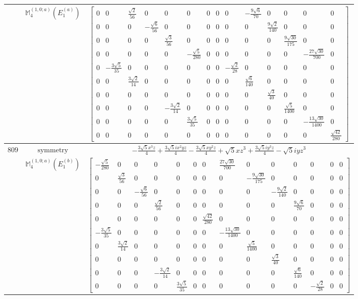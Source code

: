 \documentclass[fleqn,8pt,landscape]{jsarticle}
\begin{document}
\begin{longtable}{ccc}
$  $ & $ \mathbb{M}_{4}^{(1,0;a)}(E_{1}^{(a)}) $ & $ \begin{bmatrix} 0 & 0 & \frac{\sqrt{2}}{56} & 0 & 0 & 0 & 0 & 0 & 0 & - \frac{9 \sqrt{6}}{70} & 0 & 0 & 0 & 0 \\ 0 & 0 & 0 & - \frac{\sqrt{6}}{56} & 0 & 0 & 0 & 0 & 0 & 0 & \frac{9 \sqrt{2}}{140} & 0 & 0 & 0 \\ 0 & 0 & 0 & 0 & \frac{\sqrt{3}}{56} & 0 & 0 & 0 & 0 & 0 & 0 & \frac{9 \sqrt{30}}{175} & 0 & 0 \\ 0 & 0 & 0 & 0 & 0 & - \frac{\sqrt{5}}{280} & 0 & 0 & 0 & 0 & 0 & 0 & - \frac{27 \sqrt{30}}{700} & 0 \\ 0 & - \frac{3 \sqrt{5}}{35} & 0 & 0 & 0 & 0 & 0 & 0 & - \frac{\sqrt{2}}{28} & 0 & 0 & 0 & 0 & 0 \\ 0 & 0 & \frac{3 \sqrt{2}}{14} & 0 & 0 & 0 & 0 & 0 & 0 & \frac{\sqrt{6}}{140} & 0 & 0 & 0 & 0 \\ 0 & 0 & 0 & 0 & 0 & 0 & 0 & 0 & 0 & 0 & \frac{\sqrt{3}}{40} & 0 & 0 & 0 \\ 0 & 0 & 0 & 0 & - \frac{3 \sqrt{2}}{14} & 0 & 0 & 0 & 0 & 0 & 0 & \frac{\sqrt{5}}{1400} & 0 & 0 \\ 0 & 0 & 0 & 0 & 0 & \frac{3 \sqrt{5}}{35} & 0 & 0 & 0 & 0 & 0 & 0 & - \frac{13 \sqrt{30}}{1400} & 0 \\ 0 & 0 & 0 & 0 & 0 & 0 & 0 & 0 & 0 & 0 & 0 & 0 & 0 & \frac{\sqrt{42}}{280} \end{bmatrix} $ \\ \hline
$ 809 $ & $ \text{symmetry} $ & $ - \frac{3 \sqrt{5} x^{3} z}{4} + \frac{3 \sqrt{5} i x^{2} y z}{4} - \frac{3 \sqrt{5} x y^{2} z}{4} + \sqrt{5} x z^{3} + \frac{3 \sqrt{5} i y^{3} z}{4} - \sqrt{5} i y z^{3} $ \\
$  $ & $ \mathbb{M}_{4}^{(1,0;a)}(E_{1}^{(b)}) $ & $ \begin{bmatrix} - \frac{\sqrt{5}}{280} & 0 & 0 & 0 & 0 & 0 & 0 & \frac{27 \sqrt{30}}{700} & 0 & 0 & 0 & 0 & 0 & 0 \\ 0 & \frac{\sqrt{3}}{56} & 0 & 0 & 0 & 0 & 0 & 0 & - \frac{9 \sqrt{30}}{175} & 0 & 0 & 0 & 0 & 0 \\ 0 & 0 & - \frac{\sqrt{6}}{56} & 0 & 0 & 0 & 0 & 0 & 0 & - \frac{9 \sqrt{2}}{140} & 0 & 0 & 0 & 0 \\ 0 & 0 & 0 & \frac{\sqrt{2}}{56} & 0 & 0 & 0 & 0 & 0 & 0 & \frac{9 \sqrt{6}}{70} & 0 & 0 & 0 \\ 0 & 0 & 0 & 0 & 0 & 0 & \frac{\sqrt{42}}{280} & 0 & 0 & 0 & 0 & 0 & 0 & 0 \\ - \frac{3 \sqrt{5}}{35} & 0 & 0 & 0 & 0 & 0 & 0 & - \frac{13 \sqrt{30}}{1400} & 0 & 0 & 0 & 0 & 0 & 0 \\ 0 & \frac{3 \sqrt{2}}{14} & 0 & 0 & 0 & 0 & 0 & 0 & \frac{\sqrt{5}}{1400} & 0 & 0 & 0 & 0 & 0 \\ 0 & 0 & 0 & 0 & 0 & 0 & 0 & 0 & 0 & \frac{\sqrt{3}}{40} & 0 & 0 & 0 & 0 \\ 0 & 0 & 0 & - \frac{3 \sqrt{2}}{14} & 0 & 0 & 0 & 0 & 0 & 0 & \frac{\sqrt{6}}{140} & 0 & 0 & 0 \\ 0 & 0 & 0 & 0 & \frac{3 \sqrt{5}}{35} & 0 & 0 & 0 & 0 & 0 & 0 & - \frac{\sqrt{2}}{28} & 0 & 0 \end{bmatrix} $ \\ \hline

\end{longtable}
\end{document}
